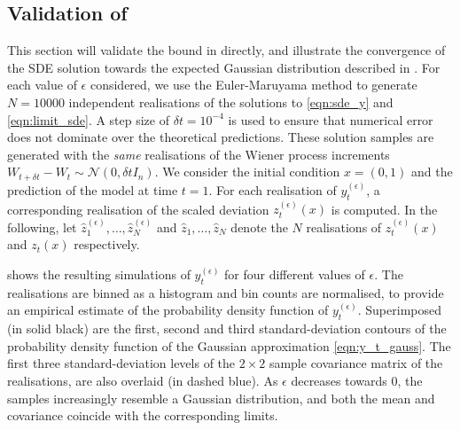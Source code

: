 \subsection{Validation of }
This section will validate the bound in  directly, and illustrate the convergence of the SDE solution towards the expected Gaussian distribution described in .
For each value of \(\epsilon\) considered, we use the Euler-Maruyama method \cite{KloedenPlaten_1992_NumericalSolutionStochastic} to generate \(N = 10000\) independent realisations of the solutions to \eqref{eqn:sde_y} and \eqref{eqn:limit_sde}.
A step size of \(\delta t = 10^{-4}\) is used to ensure that numerical error does not dominate over the theoretical predictions.
These solution samples are generated with the \emph{same} realisations of the Wiener process increments \(W_{t + \delta t} - W_t \sim \mathcal{N}\left(0, \delta t I_n\right)\).
We consider the initial condition \(x = \left(0, 1\right)\) and the prediction of the model at time \(t = 1\).
For each realisation of \(y_t^{(\epsilon)}\), a corresponding realisation of the scaled deviation \(z_t^{(\epsilon)}(x)\) is computed.
In the following, let \(\hat{z}_1^{(\epsilon)},\hdots, \hat{z}_N^{(\epsilon)}\) and \(\hat{z}_1,\hdots, \hat{z}_N\) denote the \(N\) realisations of \(z_t^{\left(\epsilon\right)}(x)\) and \(z_t(x)\) respectively.

 shows the resulting simulations of \(y_t^{(\epsilon)}\) for four different values of \(\epsilon\).
The realisations are binned as a histogram and bin counts are normalised, to provide an empirical estimate of the probability density function of \(y_t^{(\epsilon)}\).
Superimposed (in solid black) are the first, second and third standard-deviation contours of the probability density function of the Gaussian approximation \eqref{eqn:y_t_gauss}.
The first three standard-deviation levels of the \(2\times 2\) sample covariance matrix of the realisations, are also overlaid (in dashed blue).
As \(\epsilon\) decreases towards \(0\), the samples increasingly resemble a Gaussian distribution, and both the mean and covariance coincide with the corresponding limits.

